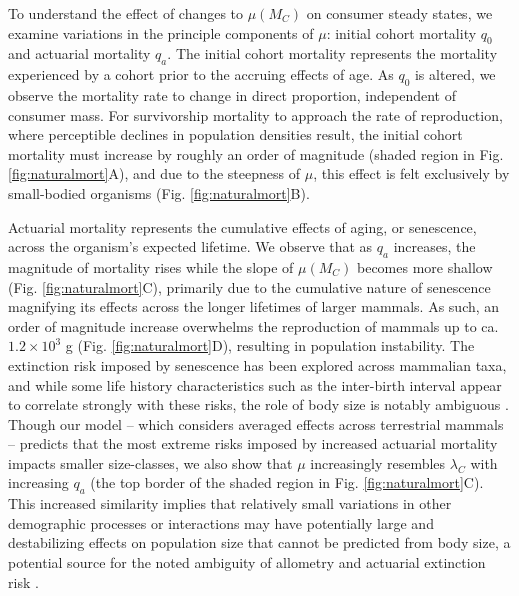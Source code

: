 \documentclass[]{rsos}%
\begin{document}
To understand the effect of changes to $\mu(M_C)$ on consumer steady states, we examine variations in the principle components of $\mu$: initial cohort mortality $q_0$ and actuarial mortality $q_a$.
The initial cohort mortality represents the mortality experienced by a cohort prior to the accruing effects of age. 
As $q_0$ is altered, we observe the mortality rate to change in direct proportion, independent of consumer mass.
For survivorship mortality to approach the rate of reproduction, where perceptible declines in population densities result, the initial cohort mortality must increase by roughly an order of magnitude (shaded region in Fig. \ref{fig:naturalmort}A), and due to the steepness of $\mu$, this effect is felt exclusively by small-bodied organisms (Fig. \ref{fig:naturalmort}B).

Actuarial mortality represents the cumulative effects of aging, or senescence, across the organism's expected lifetime. 
We observe that as $q_a$ increases, the magnitude of mortality rises while the slope of $\mu(M_C)$ becomes more shallow (Fig. \ref{fig:naturalmort}C), primarily due to the cumulative nature of senescence magnifying its effects across the longer lifetimes of larger mammals.
As such, an order of magnitude increase overwhelms the reproduction of mammals up to ca. $1.2\times10^3$ g (Fig. \ref{fig:naturalmort}D), resulting in population instability.
The extinction risk imposed by senescence has been explored across mammalian taxa, and while some life history characteristics such as the inter-birth interval appear to correlate strongly with these risks, the role of body size is notably ambiguous \cite{robert2015actuarial}.
Though our model -- which considers averaged effects across terrestrial mammals -- predicts that the most extreme risks imposed by increased actuarial mortality impacts smaller size-classes, we also show that $\mu$ increasingly resembles $\lambda_C$ with increasing $q_a$ (the top border of the shaded region in Fig. \ref{fig:naturalmort}C).
This increased similarity implies that relatively small variations in other demographic processes or interactions may have potentially large and destabilizing effects on population size that cannot be predicted from body size, a potential source for the noted ambiguity of allometry and actuarial extinction risk \cite{robert2015actuarial}.
\end{document}
